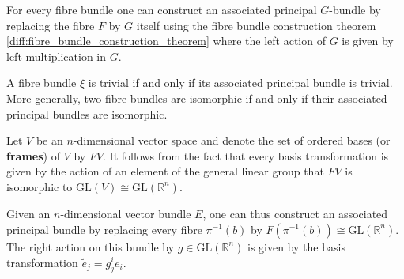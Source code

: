     \begin{construct}\label{diff:associated_bundle_construction}
        For every fibre bundle one can construct an associated principal $G$-bundle by replacing the fibre $F$ by $G$ itself using the fibre bundle construction theorem \ref{diff:fibre_bundle_construction_theorem} where the left action of $G$ is given by left multiplication in $G$.
    \end{construct}

    \begin{property}
        A fibre bundle $\xi$ is trivial if and only if its associated principal bundle is trivial. More generally, two fibre bundles are isomorphic if and only if their associated principal bundles are isomorphic.
    \end{property}

    \begin{example}\label{bundles:frame_bundle}
        Let $V$ be an $n$-dimensional vector space and denote the set of ordered bases (or \textbf{frames}) of $V$ by $FV$. It follows from the fact that every basis transformation is given by the action of an element of the general linear group that $FV$ is isomorphic to $\text{GL}(V)\cong\text{GL}(\mathbb{R}^n)$.

        Given an $n$-dimensional vector bundle $E$, one can thus construct an associated principal bundle by replacing every fibre $\pi^{-1}(b)$ by $F(\pi^{-1}(b))\cong\text{GL}(\mathbb{R}^n)$. The right action on this bundle by $g\in\text{GL}(\mathbb{R}^n)$ is given by the basis transformation $\widetilde{e}_j = g^i_je_i$.
    \end{example}

